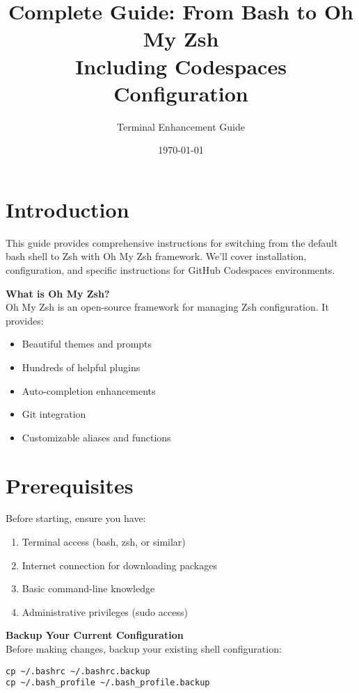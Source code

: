 \documentclass{article}
\title{Complete Guide: From Bash to Oh My Zsh\\
\large Including Codespaces Configuration}
\author{Terminal Enhancement Guide}
\date{\today}
\begin{document}
\maketitle

\tableofcontents
\newpage

\section{Introduction}

This guide provides comprehensive instructions for switching from the default bash shell to Zsh with Oh My Zsh framework. We'll cover installation, configuration, and specific instructions for GitHub Codespaces environments.

\begin{infobox}
\textbf{What is Oh My Zsh?}\\
Oh My Zsh is an open-source framework for managing Zsh configuration. It provides:
\begin{itemize}
    \item Beautiful themes and prompts
    \item Hundreds of helpful plugins
    \item Auto-completion enhancements
    \item Git integration
    \item Customizable aliases and functions
\end{itemize}
\end{infobox}

\section{Prerequisites}

Before starting, ensure you have:

\begin{enumerate}
    \item Terminal access (bash, zsh, or similar)
    \item Internet connection for downloading packages
    \item Basic command-line knowledge
    \item Administrative privileges (sudo access)
\end{enumerate}

\begin{warningbox}
\textbf{Backup Your Current Configuration}\\
Before making changes, backup your existing shell configuration:
\begin{verbatim}
cp ~/.bashrc ~/.bashrc.backup
cp ~/.bash_profile ~/.bash_profile.backup
\end{verbatim}
\end{warningbox}
\end{document}
